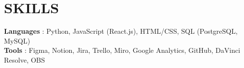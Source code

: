 \section{SKILLS}
\begin{itemize}[leftmargin=0in, label={}]
    \small{\item{
                    \textbf{Languages} {: Python, JavaScript (React.js), HTML/CSS, SQL (PostgreSQL, MySQL)}\vspace{2pt} \\
                    \textbf{Tools}     {: Figma, Notion, Jira, Trello, Miro, Google Analytics, GitHub, DaVinci Resolve, OBS}
              }}
\end{itemize}